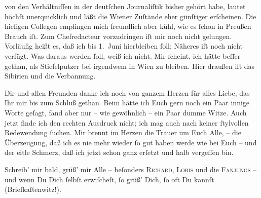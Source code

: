                von den Verhältniſſen in der deutſchen Journaliſtik bisher gehört habe, lautet höchſt
               unerquicklich und läßt die Wiener Zuſtände eher
               günſtiger erſcheinen. Die hieſigen Collegen empfingen mich freundlich aber kühl, wie
               es{ }ſchon in Preußen Brauch iſt. Zum Chefredacteur vorzudringen
               iſt mir noch nicht gelungen. Vorläufig heißt es, daß ich bis 1. Juni hierbleiben{ }ſoll; Näheres iſt noch nicht verfügt. Was daraus
               werden{ }ſoll, weiß ich nicht. Mir{ }ſcheint, ich hätte beſſer gethan, als {\pb}Stiefelputzer bei irgendwem in Wien zu bleiben. Hier draußen iſt das Sibirien und die Verbannung.\pend
           
\pstart
           Dir und allen Freunden danke ich noch von ganzem Herzen für alles Liebe, das Ihr  mir bis zum Schluß gethan. Beim \label{K_L02660-2v}\label{K_L02660-2} hätte ich
               Euch gern noch ein Paar innige Worte geſagt, fand aber nur – wie gewöhnlich – ein
               Paar dumme Witze. Auch jetzt finde ich den rechten Ausdruck nicht; ich mag auch nach
               keiner{ }ſtylvollen Redewendung{ }ſuchen. Mir brennt im Herzen die Trauer um Euch Alle, –
               die Überzeugung, daß ich es nie mehr wieder{ }ſo gut haben werde wie bei Euch – und der
               eitle Schmerz, daß ich jetzt schon ganz erſetzt und halb vergeſſen bin.\pend
           
\pstart
           Schreib’ mir bald, grüß’ mir Alle – beſonders \textsc{Richard}, \textsc{Loris} und die \textsc{Fanjungs} – und wenn Du Dich {\pb}ſelbſt erwiſcheſt,{ }ſo
               grüß’ Dich,{ }ſo oft Du kannſt (Briefkaſtenwitz!).\pend
           
